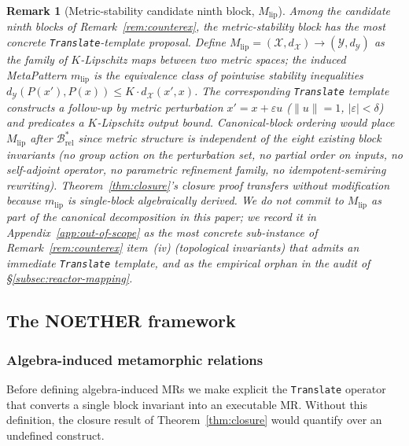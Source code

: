 \documentclass[acmsmall, screen]{acmart}
\newtheorem{remark}{Remark}
\begin{document}
\begin{remark}[Metric-stability candidate ninth block, $M_{\mathrm{lip}}$]
\label{rem:metric-stability-block}
Among the candidate ninth blocks of Remark~\ref{rem:counterex}, the metric-stability block has the most concrete \texttt{Translate}-template proposal. Define $M_{\mathrm{lip}} = (\mathcal{X}, d_{\mathcal{X}}) \to (\mathcal{Y}, d_{\mathcal{Y}})$ as the family of $K$-Lipschitz maps between two metric spaces; the induced MetaPattern $m_{\mathrm{lip}}$ is the equivalence class of pointwise stability inequalities $d_{\mathcal{Y}}(P(x'), P(x)) \le K \cdot d_{\mathcal{X}}(x', x)$. The corresponding \texttt{Translate} template constructs a follow-up by metric perturbation $x' = x + \varepsilon u$ ($\|u\| = 1$, $|\varepsilon| < \delta$) and predicates a $K$-Lipschitz output bound. Canonical-block ordering would place $M_{\mathrm{lip}}$ after $\mathcal{B}^{*}_{\mathrm{rel}}$ since metric structure is independent of the eight existing block invariants (no group action on the perturbation set, no partial order on inputs, no self-adjoint operator, no parametric refinement family, no idempotent-semiring rewriting). Theorem~\ref{thm:closure}'s closure proof transfers without modification because $m_{\mathrm{lip}}$ is single-block algebraically derived. We do not commit to $M_{\mathrm{lip}}$ as part of the canonical decomposition in this paper; we record it in Appendix~\ref{app:out-of-scope} as the most concrete sub-instance of Remark~\ref{rem:counterex} item~(iv) (topological invariants) that admits an immediate \texttt{Translate} template, and as the empirical orphan in the audit of \S\ref{subsec:reactor-mapping}.
\end{remark}

\subsection{The NOETHER framework}
\label{sec:framework}

\subsubsection{Algebra-induced metamorphic relations}

Before defining algebra-induced MRs we make explicit the \texttt{Translate} operator that converts a single block invariant into an executable MR. Without this definition, the closure result of Theorem~\ref{thm:closure} would quantify over an undefined construct.
\end{document}

